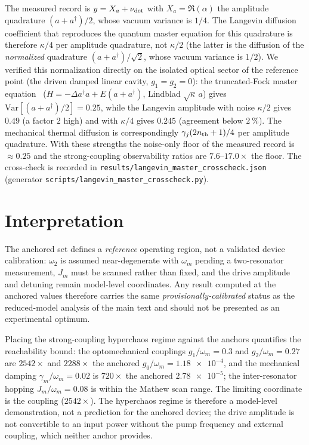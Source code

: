 \documentclass[aip,cha,reprint]{revtex4-2}
\begin{document}
The measured record is $y=X_a+\nu_{\rm det}$ with $X_a=\Re(\alpha)$ the
amplitude quadrature $(a+a^\dagger)/2$, whose vacuum variance is $1/4$. The
Langevin diffusion coefficient that reproduces the quantum master equation for
this quadrature is therefore $\kappa/4$ per amplitude quadrature, not
$\kappa/2$ (the latter is the diffusion of the \emph{normalized} quadrature
$(a+a^\dagger)/\sqrt2$, whose vacuum variance is $1/2$). We verified this
normalization directly on the isolated optical sector of the reference point
(the driven damped linear cavity, $g_1=g_2=0$): the truncated-Fock master
equation~\cite{walls2008,gardiner1985} ($H=-\Delta a^\dagger a+E(a+a^\dagger)$, Lindblad $\sqrt{\kappa}\,a$)
gives $\mathrm{Var}[(a+a^\dagger)/2]=\num{0.25}$, while the Langevin amplitude
with noise $\kappa/2$ gives $\num{0.49}$ (a factor $2$ high) and with
$\kappa/4$ gives $\num{0.245}$ (agreement below $\SI{2}{\percent}$). The mechanical thermal
diffusion is correspondingly $\gamma_j(2n_{\rm th}+1)/4$ per amplitude
quadrature. With these strengths the noise-only floor of the measured record
is $\approx\num{0.25}$ and the strong-coupling observability ratios are
$\num{7.6}$--$\num{17.0}\times$ the floor. The cross-check is recorded in
\texttt{results/langevin\_master\_crosscheck.json} (generator
\texttt{scripts/langevin\_master\_crosscheck.py}).

\section{Interpretation}

The anchored set defines a \emph{reference} operating region, not a validated
device calibration: $\omega_2$ is assumed near-degenerate with $\omega_m$ pending a
two-resonator measurement, $J_m$ must be scanned rather than fixed, and the drive
amplitude and detuning remain model-level coordinates. Any result computed at the
anchored values therefore carries the same
\emph{provisionally-calibrated} status as the reduced-model analysis of the main text
and should not be presented as an experimental optimum.

Placing the strong-coupling hyperchaos regime against the anchors quantifies
the reachability bound: the optomechanical couplings
$g_1/\omega_m=\num{0.3}$ and $g_2/\omega_m=\num{0.27}$ are $\num{2542}\times$ and
$\num{2288}\times$ the anchored $g_0/\omega_m=\num{1.18e-4}$, and the mechanical
damping $\gamma_m/\omega_m=\num{0.02}$ is $\num{720}\times$ the anchored
$\num{2.78e-5}$; the inter-resonator hopping $J_m/\omega_m=\num{0.08}$ is within
the Mathew scan range. The limiting coordinate is the coupling
($\num{2542}\times$). The hyperchaos regime is therefore a model-level
demonstration, not a prediction for the anchored device; the drive amplitude is
not convertible to an input power without the pump frequency and external
coupling, which neither anchor provides.


\end{document}
